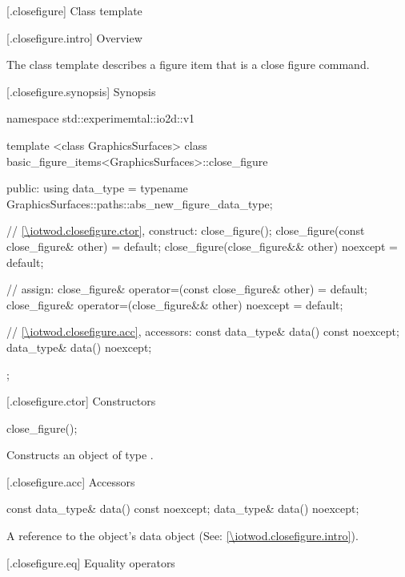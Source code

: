  [\iotwod.closefigure] {Class template }

 [\iotwod.closefigure.intro] {Overview}

\pnum
{}
The class template  describes a figure item that is a close figure command.

 [\iotwod.closefigure.synopsis] {Synopsis}
\begin{codeblock}
namespace std::experimemtal::io2d::v1 {
  template <class GraphicsSurfaces>
  class basic_figure_items<GraphicsSurfaces>::close_figure {
  public:
    using data_type =
      typename GraphicsSurfaces::paths::abs_new_figure_data_type;

    // \ref{\iotwod.closefigure.ctor}, construct:
    close_figure();
    close_figure(const close_figure& other) = default;
    close_figure(close_figure&& other) noexcept = default;

    // assign:
    close_figure& operator=(const close_figure& other) = default;
    close_figure& operator=(close_figure&& other) noexcept = default;

    // \ref{\iotwod.closefigure.acc}, accessors:
    const data_type& data() const noexcept;
    data_type& data() noexcept;
  };
}
\end{codeblock}

 [\iotwod.closefigure.ctor] {Constructors}%

%
\begin{itemdecl}
close_figure();
\end{itemdecl}
\begin{itemdescr}
\pnum
\effects Constructs an object of type .
\end{itemdescr}

 [\iotwod.closefigure.acc] {Accessors}%

%
\begin{itemdecl}
const data_type& data() const noexcept;
data_type& data() noexcept;
\end{itemdecl}
\begin{itemdescr}
\pnum
\returns A reference to the  object's data object (See: \ref{\iotwod.closefigure.intro}).
\end{itemdescr}

 [\iotwod.closefigure.eq] {Equality operators}%

